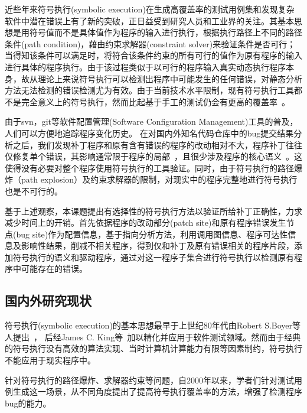 近些年来符号执行(symbolic execution)在生成高覆盖率的测试用例集和发现复杂软件中潜在错误上有了新的突破，正日益受到研究人员和工业界的关注。其基本思想是用符号值而不是具体值作为程序的输入进行执行，根据执行路径上不同的路径条件(path condition)，藉由约束求解器(constraint solver)来验证条件是否可行；当得知该条件可以满足时，将符合该条件约束的所有可行的值作为原有程序的输入进行具体的程序执行。由于该过程类似于以可行的程序输入真实动态执行程序本身，故从理论上来说符号执行可以检测出程序中可能发生的任何错误，对静态分析方法无法检测的错误检测尤为有效。由于当前技术水平限制，现有符号执行工具都不是完全意义上的符号执行，然而比起基于手工的测试仍会有更高的覆盖率~。

由于svn，git等软件配置管理(Software Configuration Management)工具的普及，人们可以方便地追踪程序变化历史。
在对国内外知名代码仓库中的bug提交结果分析之后，我们发现补丁程序和原有含有错误的程序的改动相对不大，程序补丁往往仅修复单个错误，其影响通常限于程序的局部~，且很少涉及程序的核心语义~。这使得没有必要对整个程序使用符号执行的工具验证。同时，由于符号执行的路径爆炸（path explosion）及约束求解器的限制，对现实中的程序完整地进行符号执行也是不可行的。

基于上述观察，本课题提出有选择性的符号执行方法以验证所给补丁正确性，力求减少时间上的开销。首先依据程序的改动部分(patch site)和原有程序错误发生节点(bug site)作为配置信息，基于指向分析方法，利用调用图信息、程序可达性信息及影响性结果，削减不相关程序，得到仅和补丁及原有错误相关的程序片段，添加符号执行的语义和驱动程序，通过对这一程序子集合进行符号执行以检测原有程序中可能存在的错误。

\subsection{国内外研究现状}
\label{sec:current}
符号执行(symbolic execution)的基本思想最早于上世纪80年代由Robert S.Boyer等人提出~， 后经James C. King等~加以精化并应用于软件测试领域。然而由于经典的符号执行没有高效的算法实现、当时计算机计算能力有限等因素制约，符号执行不能应用于现实程序中。

针对符号执行的路径爆炸、求解器约束等问题，自2000年以来，学者们针对测试用例生成这一场景，从不同角度提出了提高符号执行覆盖率的方法，增强了检测程序bug的能力。

